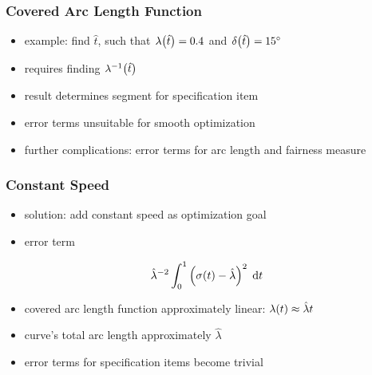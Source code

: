 \documentclass[mathserif]{beamer}
\begin{document}
		\begin{frame}
			\frametitle{Covered Arc Length Function}
			\begin{itemize}
				\item example: find \(\hat{t}\), such that \(\lambda\!\left( \hat{t} \right) = 0.4\) and \(\delta\!\left( \hat{t} \right) = 15^\circ\)
			\end{itemize}
			\begin{itemize}
				\item requires finding \(\lambda^{-1}\!\left( \hat{t} \right)\)
				\item result determines segment for specification item
				\item error terms unsuitable for smooth optimization
				\item further complications: error terms for arc length and fairness measure
			\end{itemize}
		\end{frame}

		\begin{frame}
			\frametitle{Constant Speed}
			\begin{itemize}
				\item solution: add constant speed as optimization goal
				\item error term
			\end{itemize}
			\begin{equation*}
				\hat{\lambda}^{-2}\int_{0}^{1} \left( \sigma\!\left( t \right) - \hat{\lambda} \right)^2 \; \mathrm{d}t
			\end{equation*}
			\begin{itemize}
				\item covered arc length function approximately linear: \(\lambda\!\left( t \right) \approx \hat{\lambda}t\)
				\item curve's total arc length approximately \(\hat{\lambda}\)
				\item error terms for specification items become trivial
			\end{itemize}
		\end{frame}
\end{document}
